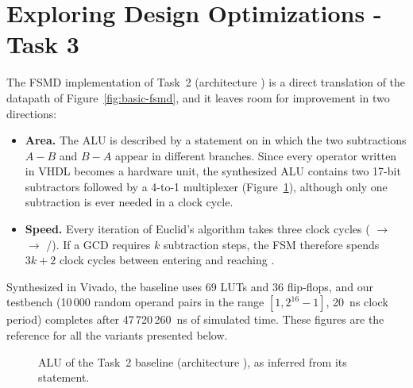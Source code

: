 \section{Exploring Design Optimizations - Task 3}

The FSMD implementation of Task~2 (architecture ) is a direct translation of the datapath of Figure~\ref{fig:basic-fsmd}, and it leaves room for improvement in two directions:
\begin{itemize}
    \item \textbf{Area.} The ALU is described by a  statement on  in which the two subtractions $A-B$ and $B-A$ appear in different branches. Since every operator written in VHDL becomes a hardware unit, the synthesized ALU contains two 17-bit subtractors followed by a 4-to-1 multiplexer (Figure~\ref{fig:t3_alu_baseline}), although only one subtraction is ever needed in a clock cycle.
    \item \textbf{Speed.} Every iteration of Euclid's algorithm takes three clock cycles ( $\rightarrow$  $\rightarrow$ /). If a GCD requires $k$ subtraction steps, the FSM therefore spends $3k+2$ clock cycles between entering  and reaching .
\end{itemize}
Synthesized in Vivado, the baseline uses 69 LUTs and 36 flip-flops, and our testbench  (10\,000 random operand pairs in the range $[1,2^{16}-1]$, 20~ns clock period) completes after 47\,720\,260~ns of simulated time. These figures are the reference for all the variants presented below.

\begin{figure}[H]
    \centering
    \caption{ALU of the Task~2 baseline (architecture ), as inferred from its  statement.}
    \label{fig:t3_alu_baseline}
\end{figure}

